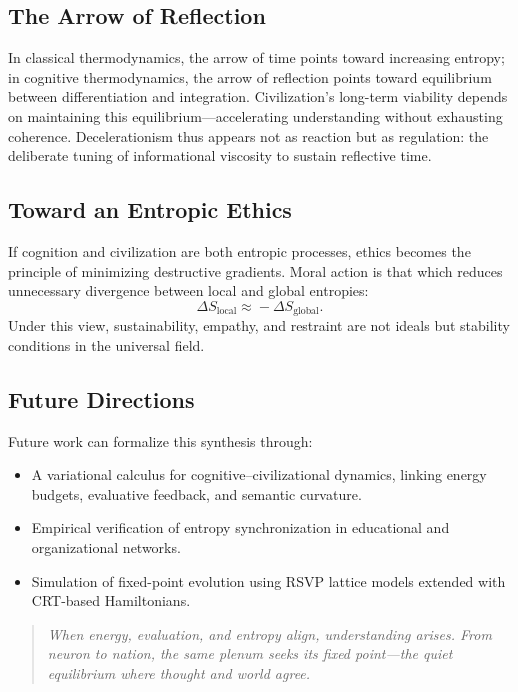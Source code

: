 \documentclass[12pt,a4paper]{article}
\begin{document}
\subsection{The Arrow of Reflection}

In classical thermodynamics, the arrow of time points toward increasing entropy;  
in cognitive thermodynamics, the arrow of reflection points toward equilibrium between differentiation and integration.  
Civilization’s long-term viability depends on maintaining this equilibrium—accelerating understanding without exhausting coherence.
Decelerationism thus appears not as reaction but as regulation: the deliberate tuning of informational viscosity to sustain reflective time.

\subsection{Toward an Entropic Ethics}

If cognition and civilization are both entropic processes, ethics becomes the principle of minimizing destructive gradients.  
Moral action is that which reduces unnecessary divergence between local and global entropies:
\[
\Delta S_{\text{local}}\!\approx\!-\Delta S_{\text{global}}.
\]
Under this view, sustainability, empathy, and restraint are not ideals but stability conditions in the universal field.

\subsection{Future Directions}

Future work can formalize this synthesis through:
\begin{itemize}[leftmargin=1.2em]
\item A variational calculus for cognitive–civilizational dynamics, linking energy budgets, evaluative feedback, and semantic curvature.
\item Empirical verification of entropy synchronization in educational and organizational networks.
\item Simulation of fixed-point evolution using RSVP lattice models extended with CRT-based Hamiltonians.
\end{itemize}

\begin{quote}
\emph{When energy, evaluation, and entropy align, understanding arises.
From neuron to nation, the same plenum seeks its fixed point—the quiet equilibrium where thought and world agree.}
\end{quote}
\end{document}
